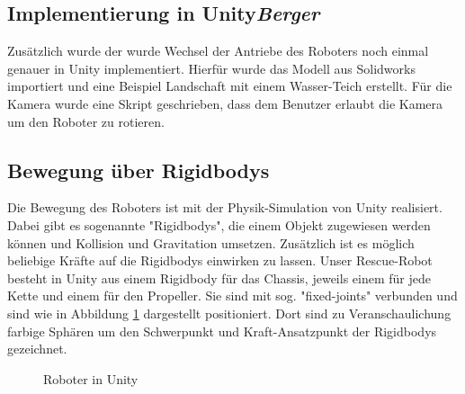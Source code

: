 \subsection{Implementierung in Unity\hfill\textnormal{\emph{Berger}}}
Zusätzlich wurde der wurde Wechsel der Antriebe des Roboters 
noch einmal genauer in Unity implementiert.
Hierfür wurde das Modell aus Solidworks importiert 
und eine Beispiel Landschaft mit einem Wasser-Teich erstellt.
Für die Kamera wurde eine Skript geschrieben, 
dass dem Benutzer erlaubt die Kamera um den Roboter zu rotieren.

\subsection{Bewegung über Rigidbodys} \label{sec:rigidbody_switch}
Die Bewegung des Roboters ist mit der Physik-Simulation von Unity realisiert.
Dabei gibt es sogenannte "Rigidbodys", die einem Objekt zugewiesen werden können
und Kollision und Gravitation umsetzen.
Zusätzlich ist es möglich beliebige Kräfte auf die Rigidbodys einwirken zu lassen.
Unser Rescue-Robot besteht in Unity aus einem Rigidbody für das Chassis,
jeweils einem für jede Kette
und einem für den Propeller.
Sie sind mit sog. "fixed-joints" verbunden 
und sind wie in Abbildung \ref{fig:unity1} dargestellt positioniert.
Dort sind zu Veranschaulichung farbige Sphären um den Schwerpunkt und 
Kraft-Ansatzpunkt der Rigidbodys gezeichnet.


\begin{figure}[H]
  \caption{Roboter in Unity}
  \label{fig:unity1}
\end{figure}

